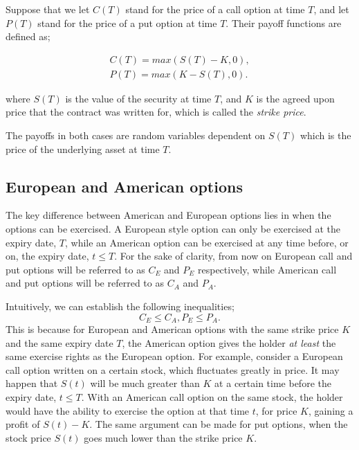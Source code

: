 \documentclass[letterpaper,12pt]{article}
\theoremstyle{plain}
\numberwithin{equation}{section}
\begin{document}
Suppose that we let $C(T)$ stand for the price of a call option at time $T$, and let $P(T)$ stand for the price of a put option at time $T$. Their payoff functions are defined as;

\begin{equation}
\begin{aligned}
	C(T) = max(S(T) - K, 0),
\\
	P(T) = max(K- S(T), 0).
\end{aligned}
\end{equation}

where $S(T)$ is the value of the security at time $T$, and $K$ is the agreed upon price that the contract was written for, which is called the {\em strike price}.

The payoffs in both cases are random variables dependent on $S(T)$ which is the price of the underlying asset at time $T$.







\subsection{European and American options}
The key difference between American and European options lies in when the options can be exercised. A European style option can only be exercised at the expiry date, $T$, while an American option can be exercised at any time before, or on, the expiry date, $t \leq T$. For the sake of clarity, from now on European call and put options will be referred to as $C_E$ and $P_E$ respectively, while American call and put options will be referred to as $C_A$ and $P_A$.

Intuitively, we can establish the following inequalities;
\begin{equation}
	C_E \leq C_A, P_E \leq P_A.
\end{equation}
This is because for European and American options with the same strike price $K$ and the same expiry date $T$, the American option gives the holder {\em at least} the same exercise rights as the European option. For example, consider a European call option written on a certain stock, which fluctuates greatly in price. It may happen that $S(t)$ will be much greater than $K$ at a certain time before the expiry date, $t \leq T$. With an American call option on the same stock, the holder would have the ability to exercise the option at that time $t$, for price $K$, gaining a profit of $S(t) - K$. The same argument can be made for put options, when the stock price $S(t)$ goes much lower than the strike price $K$.
\end{document}
